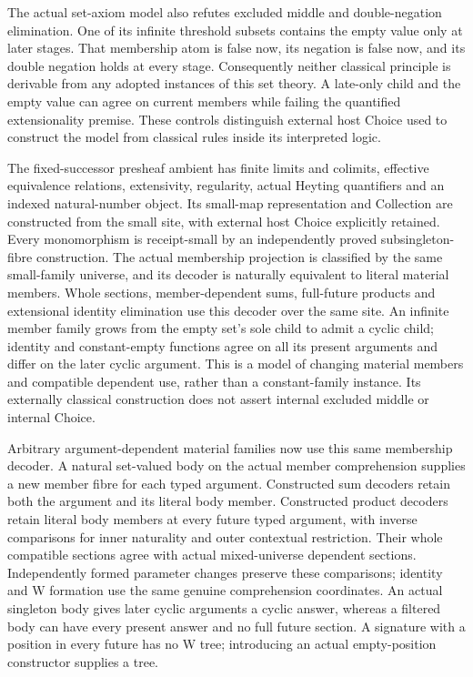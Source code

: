 \documentclass[11pt]{article}
\theoremstyle{definition}
\theoremstyle{remark}
\begin{document}
The actual set-axiom model also refutes excluded middle and
double-negation elimination. One of its infinite threshold subsets
contains the empty value only at later stages. That membership atom is
false now, its negation is false now, and its double negation holds at
every stage. Consequently neither classical principle is derivable from
any adopted instances of this set theory. A late-only child and the empty
value can agree on current members while failing the quantified
extensionality premise. These controls distinguish external host Choice
used to construct the model from classical rules inside its interpreted
logic.

The fixed-successor presheaf ambient has finite limits and colimits,
effective equivalence relations, extensivity, regularity, actual Heyting
quantifiers and an indexed natural-number object. Its small-map
representation and Collection are constructed from the small site, with
external host Choice explicitly retained. Every monomorphism is
receipt-small by an independently proved subsingleton-fibre construction.
The actual membership projection is classified by the same small-family
universe, and its decoder is naturally equivalent to literal material
members. Whole sections, member-dependent sums, full-future products and
extensional identity elimination use this decoder over the same site.
An infinite member family grows from the empty set's sole child to admit
a cyclic child; identity and constant-empty functions agree on all its
present arguments and differ on the later cyclic argument. This is a
model of changing material members and compatible dependent use, rather
than a constant-family instance. Its externally classical construction
does not assert internal excluded middle or internal Choice.

Arbitrary argument-dependent material families now use this same
membership decoder. A natural set-valued body on the actual member
comprehension supplies a new member fibre for each typed argument.
Constructed sum decoders retain both the argument and its literal body
member. Constructed product decoders retain literal body members at every
future typed argument, with inverse comparisons for inner naturality and
outer contextual restriction. Their whole compatible sections agree with
actual mixed-universe dependent sections. Independently formed parameter
changes preserve these comparisons; identity and W formation use the
same genuine comprehension coordinates. An actual singleton body gives
later cyclic arguments a cyclic answer, whereas a filtered body can have
every present answer and no full future section. A signature with a
position in every future has no W tree; introducing an actual
empty-position constructor supplies a tree.
\end{document}
